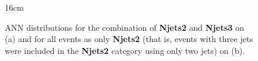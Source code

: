 \begin{figure}[hbtp]{16cm}
	\caption{ANN distributions for the combination of \textbf{Njets2} and \textbf{Njets3} on (a) and for all events as only \textbf{Njets2} (that is, events with three jets were included in the \textbf{Njets2} category using only two jets) on (b).}	
	\centering
	\label{fig:k57nj2_njets2all_shapes_prefit}
\end{figure}

